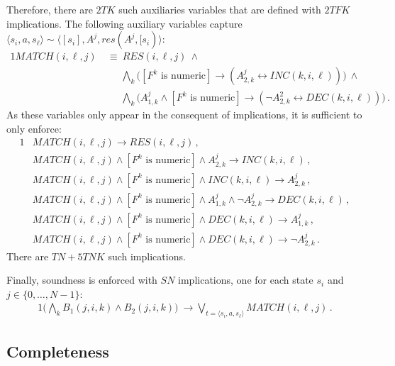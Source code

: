\documentclass[10pt]{article}
\newcommand{\tup}[1]{\langle #1 \rangle}
\begin{document}
Therefore, there are $2TK$ such auxiliaries variables that are defined with $2TFK$ implications.
The following auxiliary variables capture $\tup{s_i,a,s_\ell}\sim\tup{[s_i],A^j,res(A^j,[s_i)}$:
\begin{alignat}{1}
  MATCH(i,\ell,j)\ &\equiv\ RES(i,\ell,j)\ \land \\
                   &\quad\ \, \bigwedge_k \biggl([\text{$F^k$ is numeric}] \rightarrow (A^j_{2,k} \leftrightarrow INC(k,i,\ell))\biggr)\ \land \\
                   &\quad\ \, \bigwedge_k \biggl(A^j_{1,k} \land [\text{$F^k$ is numeric}] \rightarrow (\neg A^2_{2,k} \leftrightarrow DEC(k,i,\ell))\biggr) \,.
\end{alignat}
As these variables only appear in the consequent of implications, it is sufficient to only
enforce:
\begin{alignat}{1}
  &MATCH(i,\ell,j) \rightarrow RES(i,\ell,j) \,, \\
  &MATCH(i,\ell,j) \land [\text{$F^k$ is numeric}] \land A^j_{2,k} \rightarrow INC(k,i,\ell) \,, \\
  &MATCH(i,\ell,j) \land [\text{$F^k$ is numeric}] \land INC(k,i,\ell) \rightarrow A^j_{2,k} \,, \\
  &MATCH(i,\ell,j) \land [\text{$F^k$ is numeric}] \land A^j_{1,k} \land \neg A^j_{2,k} \rightarrow DEC(k,i,\ell) \,, \\
  &MATCH(i,\ell,j) \land [\text{$F^k$ is numeric}] \land DEC(k,i,\ell) \rightarrow A^j_{1,k} \,, \\
  &MATCH(i,\ell,j) \land [\text{$F^k$ is numeric}] \land DEC(k,i,\ell) \rightarrow \neg A^j_{2,k} \,.
\end{alignat}
There are $TN + 5TNK$ such implications.

Finally, soundness is enforced with $SN$ implications, one for each state $s_i$ and $j\in\{0,\ldots,N-1\}$:
\begin{alignat}{1}
  \biggl(\bigwedge_k B_1(j,i,k) \land B_2(j,i,k)\biggr)\ \rightarrow
  \bigvee_{t=\tup{s_i,a,s_\ell}} MATCH(i,\ell,j) \,.
\end{alignat}


\subsection{Completeness}
\end{document}
